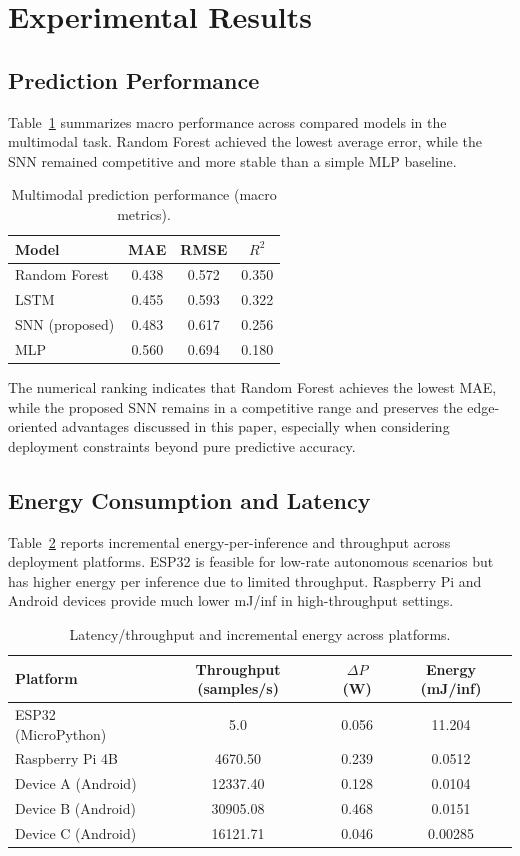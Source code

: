 \section{Experimental Results}

\subsection{Prediction Performance}
Table~\ref{tab:pred_perf} summarizes macro performance across compared models in the multimodal task. Random Forest achieved the lowest average error, while the SNN remained competitive and more stable than a simple MLP baseline.

\begin{table}[!h]
\caption{Multimodal prediction performance (macro metrics).}
\label{tab:pred_perf}
\centering
\begin{tabular}{lccc}
\toprule
Model & MAE & RMSE & $R^2$ \\
\midrule
Random Forest & 0.438 & 0.572 & 0.350 \\
LSTM & 0.455 & 0.593 & 0.322 \\
SNN (proposed) & 0.483 & 0.617 & 0.256 \\
MLP & 0.560 & 0.694 & 0.180 \\
\bottomrule
\end{tabular}
\end{table}

The numerical ranking indicates that Random Forest achieves the lowest MAE, while the proposed SNN remains in a competitive range and preserves the edge-oriented advantages discussed in this paper, especially when considering deployment constraints beyond pure predictive accuracy.

\subsection{Energy Consumption and Latency}
Table~\ref{tab:energy_latency} reports incremental energy-per-inference and throughput across deployment platforms. ESP32 is feasible for low-rate autonomous scenarios but has higher energy per inference due to limited throughput. Raspberry Pi and Android devices provide much lower mJ/inf in high-throughput settings.

\begin{table}[!htbp]
\caption{Latency/throughput and incremental energy across platforms.}
\label{tab:energy_latency}
\centering
\begin{tabular}{lccc}
\toprule
Platform & Throughput (samples/s) & $\Delta P$ (W) & Energy (mJ/inf) \\
\midrule
ESP32 (MicroPython) & 5.0 & 0.056 & 11.204 \\
Raspberry Pi 4B & 4670.50 & 0.239 & 0.0512 \\
Device A (Android) & 12337.40 & 0.128 & 0.0104 \\
Device B (Android) & 30905.08 & 0.468 & 0.0151 \\
Device C (Android) & 16121.71 & 0.046 & 0.00285 \\
\bottomrule
\end{tabular}
\end{table}

